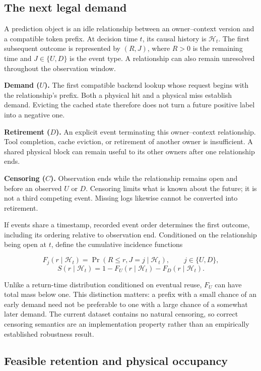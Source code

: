 \documentclass[sigconf, screen, review]{acmart}
\begin{document}
\subsection{The next legal demand}\label{the-next-legal-demand}

A prediction object is an idle relationship between an owner--context
version and a compatible token prefix. At decision time \(t\), its
causal history is \(\mathcal H_t\). The first subsequent outcome is
represented by \((R,J)\), where \(R>0\) is the remaining time and
\(J\in\{U,D\}\) is the event type. A relationship can also remain
unresolved throughout the observation window.

\textbf{Demand (\(U\)).} The first compatible backend lookup whose
request begins with the relationship's prefix. Both a physical hit and a
physical miss establish demand. Evicting the cached state therefore does
not turn a future positive label into a negative one.

\textbf{Retirement (\(D\)).} An explicit event terminating this
owner--context relationship. Tool completion, cache eviction, or
retirement of another owner is insufficient. A shared physical block can
remain useful to its other owners after one relationship ends.

\textbf{Censoring (\(C\)).} Observation ends while the relationship
remains open and before an observed \(U\) or \(D\). Censoring limits
what is known about the future; it is not a third competing event.
Missing logs likewise cannot be converted into retirement.

If events share a timestamp, recorded event order determines the first
outcome, including its ordering relative to observation end. Conditioned
on the relationship being open at \(t\), define the cumulative incidence
functions

\[
F_j(r\mid\mathcal H_t)=\Pr(R\le r,J=j\mid\mathcal H_t),
\qquad j\in\{U,D\},
\] \[
S(r\mid\mathcal H_t)=1-F_U(r\mid\mathcal H_t)-F_D(r\mid\mathcal H_t).
\]

Unlike a return-time distribution conditioned on eventual reuse, \(F_U\)
can have total mass below one. This distinction matters: a prefix with a
small chance of an early demand need not be preferable to one with a
large chance of a somewhat later demand. The current dataset contains no
natural censoring, so correct censoring semantics are an implementation
property rather than an empirically established robustness result.

\subsection{Feasible retention and physical
occupancy}\label{feasible-retention-and-physical-occupancy}
\end{document}
